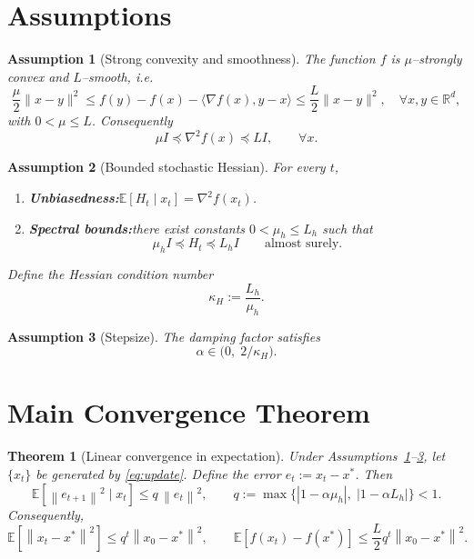 \documentclass{article}
\newtheorem{theorem}{Theorem}
\newtheorem{assumption}{Assumption}
\newcommand{\E}{\mathbb{E}}
\newcommand{\R}{\mathbb{R}}
\newcommand{\norm}[1]{\left\|#1\right\|}
\begin{document}
\newpage
\section*{Assumptions}
\begin{assumption}[Strong convexity and smoothness]\label{ass:strong}
The function $f$ is $\mu$–strongly convex and $L$–smooth, i.e.
\[
\frac{\mu}{2}\|x-y\|^{2}\le f(y)-f(x)-\langle\nabla f(x),y-x\rangle\le
\frac{L}{2}\|x-y\|^{2},\quad\forall x,y\in\R^{d},
\]
with $0<\mu\le L$. Consequently
\[
\mu I\preceq \nabla^{2}f(x)\preceq L I,\qquad\forall x.
\]
\end{assumption}

\begin{assumption}[Bounded stochastic Hessian]\label{ass:hessian}
For every $t$,
\begin{enumerate}[label=(\roman*)]
\item \textbf{Unbiasedness:}\quad $\E[H_{t}\mid x_{t}]=\nabla^{2}f(x_{t})$.
\item \textbf{Spectral bounds:}\quad there exist constants $0<\mu_{h}\le L_{h}$ such that
\[
\mu_{h} I\preceq H_{t}\preceq L_{h} I\qquad\text{almost surely}.
\]
\end{enumerate}
Define the \emph{Hessian condition number}
\[
\kappa_{H}:=\frac{L_{h}}{\mu_{h}}.
\]
\end{assumption}

\begin{assumption}[Stepsize]\label{ass:stepsize}
The damping factor satisfies
\[
\alpha\in\bigl(0,\;2/\kappa_{H}\bigr).
\]
\end{assumption}

\section*{Main Convergence Theorem}
\begin{theorem}[Linear convergence in expectation]\label{thm:linear}
Under Assumptions~\ref{ass:strong}--\ref{ass:stepsize}, let $\{x_{t}\}$ be generated by \eqref{eq:update}.  
Define the error $e_{t}:=x_{t}-x^{*}$. Then
\begin{equation}
\E\!\left[\norm{e_{t+1}}^{2}\mid x_{t}\right]
\le q\,\norm{e_{t}}^{2},
\qquad 
q:=\max\bigl\{|1-\alpha\mu_{h}|,\;|1-\alpha L_{h}|\bigr\}<1.
\label{eq:contraction}
\end{equation}
Consequently,
\[
\E\!\left[\norm{x_{t}-x^{*}}^{2}\right]\le q^{t}\norm{x_{0}-x^{*}}^{2},
\qquad
\E\!\left[f(x_{t})-f(x^{*})\right]\le \frac{L}{2}q^{t}\norm{x_{0}-x^{*}}^{2}.
\]
\end{theorem}
\end{document}
